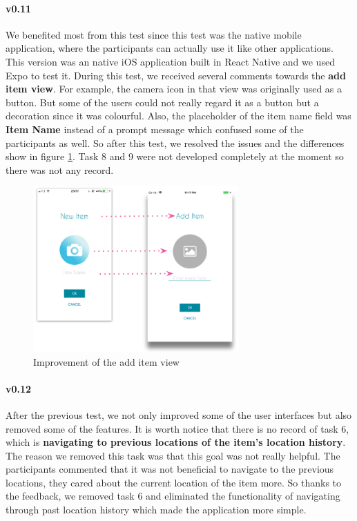 \documentclass[12pt,a4paper]{article}
\begin{document}
          \paragraph{v0.11} We benefited most from this test since this test was the native mobile application, where the participants can actually use it like other applications. This version was an native iOS application built in React Native and we used Expo to test it. During this test, we received several comments towards the {\bf add item view}. For example, the camera icon in that view was originally used as a button. But some of the users could not really regard it as a button but a decoration since it was colourful. Also, the placeholder of the item name field was {\bf Item Name} instead of a prompt message which confused some of the participants as well. So after this test, we resolved the issues and the differences show in figure \ref{fig:usability-test-ios-v010-improvements}. Task 8 and 9 were not developed completely at the moment so there was not any record.

          \begin{figure}[H]
            \centering
            \includegraphics[width=0.7\textwidth]{../assets/usability-test-ios-v010-improvements.png}
            \caption{Improvement of the add item view}
            \label{fig:usability-test-ios-v010-improvements}
          \end{figure}

          \paragraph{v0.12} After the previous test, we not only improved some of the user interfaces but also removed some of the features. It is worth notice that there is no record of task 6, which is {\bf navigating to previous locations of the item's location history}. The reason we removed this task was that this goal was not really helpful. The participants commented that it was not beneficial to navigate to the previous locations, they cared about the current location of the item more. So thanks to the feedback, we removed task 6 and eliminated the functionality of navigating through past location history which made the application more simple. 
        
\end{document}
